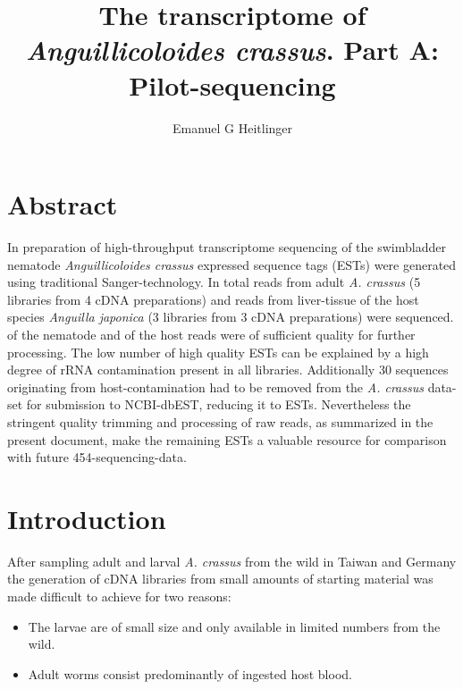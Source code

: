 \documentclass[12pt,a4paper]{article}
\begin{document}








\title{The transcriptome of \textit{Anguillicoloides crassus}. Part A:
  Pilot-sequencing} \author{Emanuel G Heitlinger} \date{}
\maketitle

\section*{Abstract}
In preparation of high-throughput transcriptome sequencing of the
swimbladder nematode \textit{Anguillicoloides crassus} expressed
sequence tags (ESTs) were generated using traditional
Sanger-technology. In total  reads from
adult \textit{A. crassus} (5 libraries from 4 cDNA preparations) and
 reads from liver-tissue of the host
species \textit{Anguilla japonica} (3 libraries from 3 cDNA
preparations) were sequenced.  of the
nematode and  of the host reads were
of sufficient quality for further processing. The low number of high
quality ESTs can be explained by a high degree of rRNA contamination
present in all libraries. Additionally
30 sequences originating from
host-contamination had to be removed from the \textit{A. crassus}
data-set for submission to NCBI-dbEST, reducing it to
 ESTs. Nevertheless the stringent
quality trimming and processing of raw reads, as summarized in the
present document, make the remaining ESTs a valuable resource for
comparison with future 454-sequencing-data.

\section*{Introduction}

After sampling adult and larval \textit{A. crassus} from the wild in
Taiwan and Germany the generation of cDNA libraries from small amounts
of starting material was made difficult to achieve for two reasons:
\begin{itemize}
\item The larvae are of small size and only available in limited
  numbers from the wild.
\item Adult worms consist predominantly of ingested host blood.
\end{itemize}
\end{document}
